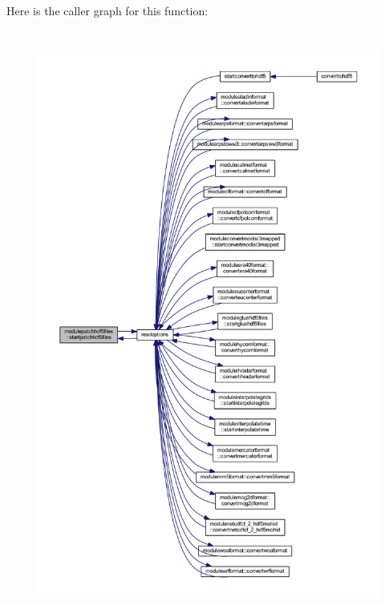 Here is the caller graph for this function\+:\nopagebreak
\begin{figure}[H]
\begin{center}
\leavevmode
\includegraphics[height=550pt]{namespacemodulepatchhdf5files_a3b72c3b4723946c225c3539103a6662e_icgraph}
\end{center}
\end{figure}
\mbox{\label{namespacemodulepatchhdf5files_a5d3c460838e5e6b1caa6735da5973943}} 
